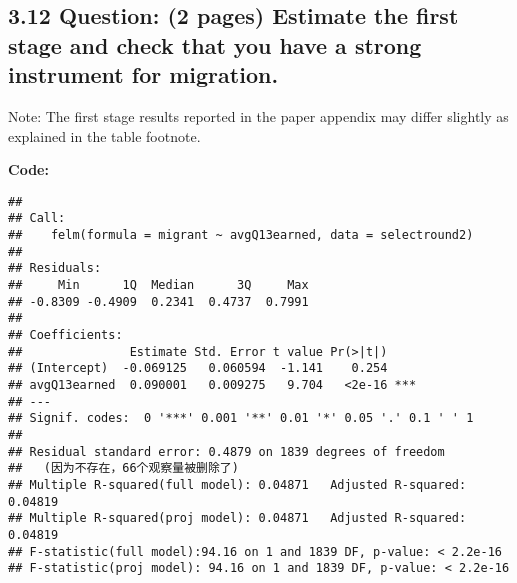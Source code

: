 \documentclass[
]{article}
\newenvironment{Shaded}{\begin{snugshade}}{\end{snugshade}}
\newcommand{\CommentTok}[1]{\textcolor[rgb]{0.56,0.35,0.01}{\textit{#1}}}
\newcommand{\DocumentationTok}[1]{\textcolor[rgb]{0.56,0.35,0.01}{\textbf{\textit{#1}}}}
\newcommand{\FloatTok}[1]{\textcolor[rgb]{0.00,0.00,0.81}{#1}}
\newcommand{\FunctionTok}[1]{\textcolor[rgb]{0.13,0.29,0.53}{\textbf{#1}}}
\newcommand{\NormalTok}[1]{#1}
\newcommand{\OtherTok}[1]{\textcolor[rgb]{0.56,0.35,0.01}{#1}}
\newcommand{\SpecialCharTok}[1]{\textcolor[rgb]{0.81,0.36,0.00}{\textbf{#1}}}
\begin{document}
\clearpage

\hypertarget{question-2-pages-estimate-the-first-stage-and-check-that-you-have-a-strong-instrument-for-migration.}{%
\subsection{\texorpdfstring{3.12 \textbf{Question: (2 pages) Estimate
the first stage and check that you have a strong instrument for
migration.}}{3.12 Question: (2 pages) Estimate the first stage and check that you have a strong instrument for migration.}}\label{question-2-pages-estimate-the-first-stage-and-check-that-you-have-a-strong-instrument-for-migration.}}

Note: The first stage results reported in the paper appendix may differ
slightly as explained in the table footnote.

\textbf{Code:}

\begin{Shaded}
\end{Shaded}

\begin{verbatim}
## 
## Call:
##    felm(formula = migrant ~ avgQ13earned, data = selectround2) 
## 
## Residuals:
##     Min      1Q  Median      3Q     Max 
## -0.8309 -0.4909  0.2341  0.4737  0.7991 
## 
## Coefficients:
##               Estimate Std. Error t value Pr(>|t|)    
## (Intercept)  -0.069125   0.060594  -1.141    0.254    
## avgQ13earned  0.090001   0.009275   9.704   <2e-16 ***
## ---
## Signif. codes:  0 '***' 0.001 '**' 0.01 '*' 0.05 '.' 0.1 ' ' 1
## 
## Residual standard error: 0.4879 on 1839 degrees of freedom
##   (因为不存在，66个观察量被删除了)
## Multiple R-squared(full model): 0.04871   Adjusted R-squared: 0.04819 
## Multiple R-squared(proj model): 0.04871   Adjusted R-squared: 0.04819 
## F-statistic(full model):94.16 on 1 and 1839 DF, p-value: < 2.2e-16 
## F-statistic(proj model): 94.16 on 1 and 1839 DF, p-value: < 2.2e-16
\end{verbatim}
\end{document}
